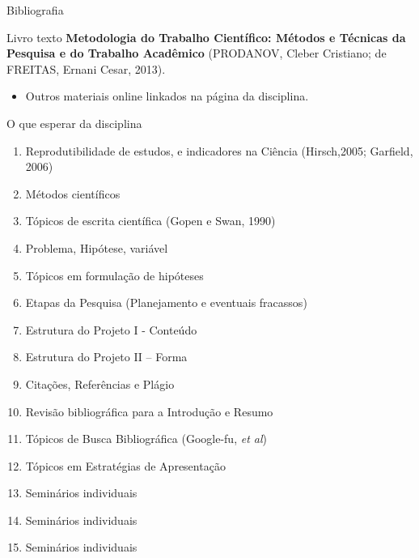 \documentclass{beamer}
\begin{document}
\begin{frame}{Bibliografia}
  \begin{block}{Livro texto}
    {\bf Metodologia do Trabalho Científico: Métodos e Técnicas da Pesquisa e do Trabalho Acadêmico} (PRODANOV, Cleber Cristiano; de FREITAS, Ernani Cesar, 2013).
  \end{block}
  \begin{itemize}
  \item Outros materiais online linkados na página da disciplina.
  \end{itemize}
\end{frame}

\begin{frame}{O que esperar da disciplina}
  \tiny
  \begin{enumerate}
  \item<2,6> {Reprodutibilidade de estudos, e indicadores na Ciência (Hirsch,2005; Garfield, 2006)}
  \item<2,6> {Métodos científicos}
  \item<2,6> {Tópicos de escrita científica} (Gopen e Swan, 1990)
  \item<2,6> {Problema, Hipótese, variável}
  \item<2,6> {Tópicos em formulação de hipóteses}
  \item<2,6> \alert<6>{Etapas da Pesquisa (Planejamento e eventuais fracassos)}
  \item<3,6> {Estrutura do Projeto I - Conteúdo}
  \item<3,6> {Estrutura do Projeto II – Forma}
  \item<3,6> {Citações, Referências e Plágio}
  \item<4,6> {Revisão bibliográfica para a Introdução e Resumo}
  \item<4,6> {Tópicos de Busca Bibliográfica (Google-fu, {\em et al})}
  \item<5,6> \alert<6>{Tópicos em Estratégias de Apresentação}
  \item<1-> \alert<6>{Seminários individuais}
  \item<1-> \alert<6>{Seminários individuais}
  \item<1-> \alert<6>{Seminários individuais}
  \end{enumerate}
\end{frame}
\end{document}
